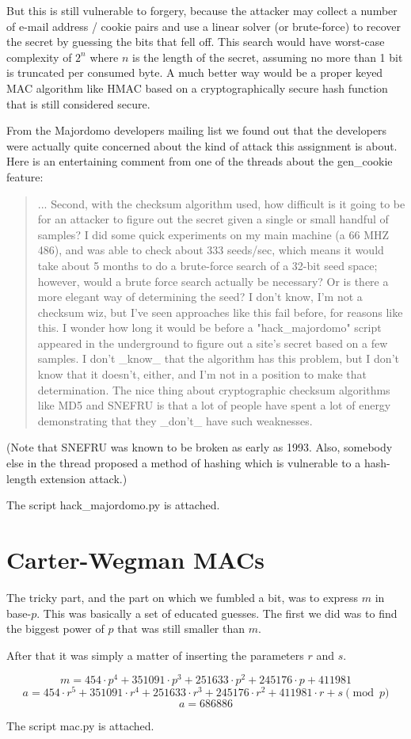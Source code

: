 \documentclass{article}
\begin{document}
But this is still vulnerable to forgery, because the attacker may collect a number of e-mail address / cookie pairs and use a linear solver (or brute-force) to recover the secret by guessing the bits that fell off.
This search would have worst-case complexity of $2^n$ where $n$ is the length of the secret, assuming no more than 1 bit is truncated per consumed byte.
A much better way would be a proper keyed MAC algorithm like HMAC based on a cryptographically secure hash function that is still considered secure.

From the Majordomo developers mailing list we found out that the developers were actually quite concerned about the kind of attack this assignment is about.
Here is an entertaining comment from one of the threads about the gen\_cookie feature:
\begin{quotation}
	...
	Second, with the checksum algorithm used, how difficult is it going to be
	for an attacker to figure out the secret given a single or small handful of
	samples?  I did some quick experiments on my main machine (a 66 MHZ 486),
	and was able to check about 333 seeds/sec, which means it would take about
	5 months to do a brute-force search of a 32-bit seed space; however, would
	a brute force search actually be necessary?  Or is there a more elegant way
	of determining the seed?  I don't know, I'm not a checksum wiz, but I've
	seen approaches like this fail before, for reasons like this.  I wonder how
	long it would be before a "hack\_majordomo" script appeared in the
	underground to figure out a site's secret based on a few samples.  I don't
	\_know\_ that the algorithm has this problem, but I don't know that it
	doesn't, either, and I'm not in a position to make that determination.  The
	nice thing about cryptographic checksum algorithms like MD5 and SNEFRU is
	that a lot of people have spent a lot of energy demonstrating that they
	\_don't\_ have such weaknesses.
\end{quotation}
\cite{majordomo_thread}
(Note that SNEFRU was known to be broken as early as 1993. Also, somebody else in the thread proposed a method of hashing which is vulnerable to a hash-length extension attack.)

The script hack\_majordomo.py is attached.

\section{Carter-Wegman MACs}
The tricky part, and the part on which we fumbled a bit, was to express $m$ in base-$p$.
This was basically a set of educated guesses.
The first we did was to find the biggest power of $p$ that was still smaller than $m$.



After that it was simply a matter of inserting the parameters $r$ and $s$.

\[ m = 454 \cdot p^4 + 351091 \cdot p^3 + 251633 \cdot p^2 + 245176 \cdot p + 411981 \]
\[ a = 454 \cdot r^5 + 351091 \cdot r^4 + 251633 \cdot r^3 + 245176 \cdot r^2 + 411981 \cdot r + s \pmod p \]
\[ a = 686886 \]



The script mac.py is attached.



 
\end{document}
